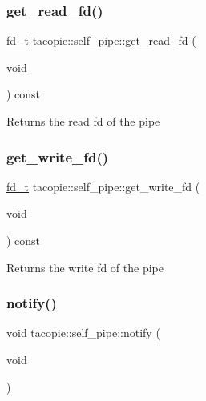 \subsubsection{\texorpdfstring{get\+\_\+read\+\_\+fd()}{get\_read\_fd()}}
{\footnotesize\ttfamily \hyperlink{namespacetacopie_acce7ad26b2d30156b1e6fa353f727026}{fd\+\_\+t} tacopie\+::self\+\_\+pipe\+::get\+\_\+read\+\_\+fd (\begin{DoxyParamCaption}\item[{void}]{ }\end{DoxyParamCaption}) const}

\begin{DoxyReturn}{Returns}
the read fd of the pipe 
\end{DoxyReturn}
\mbox{\label{classtacopie_1_1self__pipe_ab36a4deb45bb408988f26315aedc0d74}} 
\subsubsection{\texorpdfstring{get\+\_\+write\+\_\+fd()}{get\_write\_fd()}}
{\footnotesize\ttfamily \hyperlink{namespacetacopie_acce7ad26b2d30156b1e6fa353f727026}{fd\+\_\+t} tacopie\+::self\+\_\+pipe\+::get\+\_\+write\+\_\+fd (\begin{DoxyParamCaption}\item[{void}]{ }\end{DoxyParamCaption}) const}

\begin{DoxyReturn}{Returns}
the write fd of the pipe 
\end{DoxyReturn}
\mbox{\label{classtacopie_1_1self__pipe_ade9e0e3d19b8d4d22977935a578d508e}} 
\subsubsection{\texorpdfstring{notify()}{notify()}}
{\footnotesize\ttfamily void tacopie\+::self\+\_\+pipe\+::notify (\begin{DoxyParamCaption}\item[{void}]{ }\end{DoxyParamCaption})}

